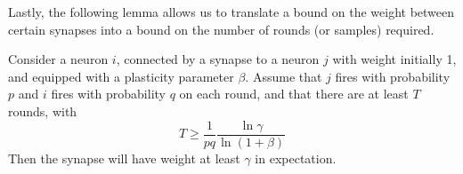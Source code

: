 \documentclass[final,12pt]{colt2022} %
\newcommand{\E}{\mathbb{E}}
\begin{document}

\noindent Lastly, the following lemma allows us to translate a bound on the weight between certain synapses into a bound on the number of rounds (or samples) required.

\begin{lemma} \label{lemma:nrounds}
Consider a neuron $i$, connected by a synapse to a neuron $j$ with weight initially 1, and equipped with a plasticity parameter $\beta$. Assume that $j$ fires with probability $p$ and $i$ fires with probability $q$ on each round, and that there are at least $T$ rounds, with \[T \geq \frac{1}{pq}\frac{\ln \gamma}{\ln(1+\beta)}\] Then the synapse will have weight at least $\gamma$ in expectation.
\end{lemma}
\end{document}
